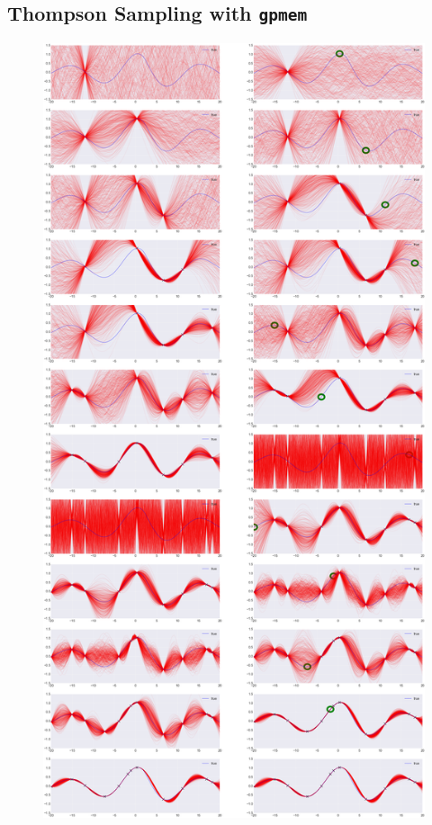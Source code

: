\documentclass[a0,portrait]{a0poster}
\begin{document}
\begin{multicols}{2}
\subsection*{Thompson Sampling with {\tt gpmem}}
\begin{figure}
\includegraphics[width=20cm]{BayesOpt_gpmem_sequence.png}
\end{figure}


\end{multicols}
\end{document}
